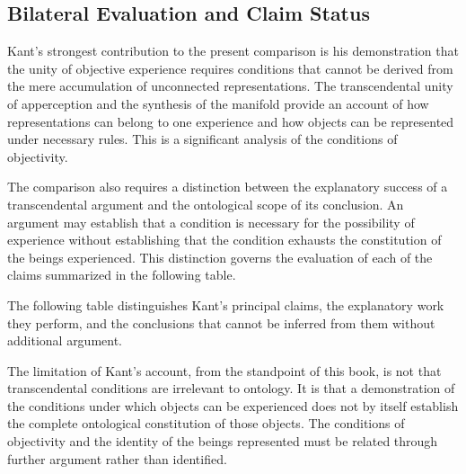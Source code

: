 
\subsection{Bilateral Evaluation and Claim Status}
\label{subsec:ch08-kant-evaluation}

\label{para:VS.B01.P01.C08.S10.SS14.P001}

Kant's strongest contribution to the present
comparison is his demonstration that the
unity of objective experience requires
conditions that cannot be derived from
the mere accumulation of unconnected
representations. The transcendental unity
of apperception and the synthesis of the
manifold provide an account of how
representations can belong to one
experience and how objects can be
represented under necessary rules.
This is a significant analysis of the
conditions of objectivity.

\label{para:VS.B01.P01.C08.S10.SS14.P002}

The comparison also requires a distinction between
the explanatory success of a transcendental argument
and the ontological scope of its conclusion. An argument
may establish that a condition is necessary for the
possibility of experience without establishing that
the condition exhausts the constitution of the beings
experienced. This distinction governs the evaluation
of each of the claims summarized in the following table.

\label{para:VS.B01.P01.C08.S10.SS14.P003}

The following table distinguishes Kant's
principal claims, the explanatory work
they perform, and the conclusions that
cannot be inferred from them without
additional argument.



\label{para:VS.B01.P01.C08.S10.SS14.P004}

The limitation of Kant's account, from the
standpoint of this book, is not that
transcendental conditions are irrelevant
to ontology. It is that a demonstration
of the conditions under which objects
can be experienced does not by itself
establish the complete ontological
constitution of those objects. The
conditions of objectivity and the
identity of the beings represented
must be related through further
argument rather than identified.

